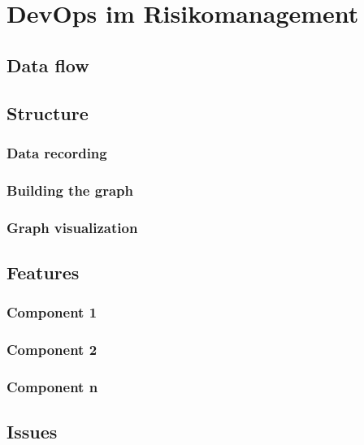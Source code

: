 \chapter{DevOps im Risikomanagement}
\label{cha:Conclusion}



\section{Data flow}

\section{Structure}

 

\subsection{Data recording}


\subsection{Building the graph}


\subsection{Graph visualization}


\section{Features}


\subsection{Component 1}
\subsection{Component 2}
\subsection{Component n}




\section{Issues}






